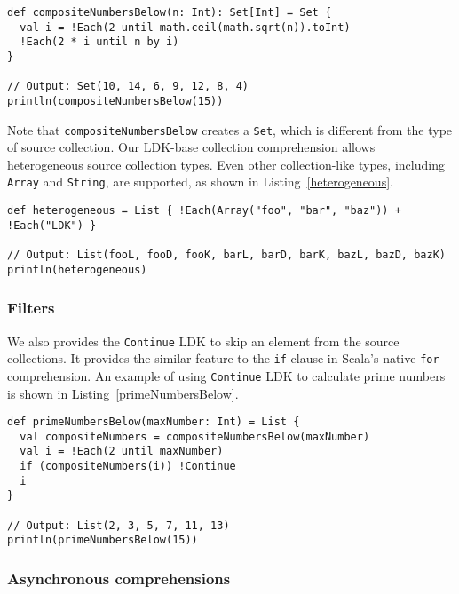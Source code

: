 \begin{lstlisting}[caption={Calculating all composite numbers below $n$ with \lstinline{Each} LDK, the simplicied version},label={compositeNumbersBelow-simplified}]
def compositeNumbersBelow(n: Int): Set[Int] = Set {
  val i = !Each(2 until math.ceil(math.sqrt(n)).toInt)
  !Each(2 * i until n by i)
}

// Output: Set(10, 14, 6, 9, 12, 8, 4)
println(compositeNumbersBelow(15))
\end{lstlisting}

Note that \lstinline{compositeNumbersBelow} creates a \lstinline{Set}, which is different from the type of source collection. Our LDK-base collection comprehension allows heterogeneous source collection types. Even other collection-like types, including \lstinline{Array} and \lstinline{String}, are supported, as shown in Listing~\ref{heterogeneous}.

\begin{lstlisting}[caption={LDK-based heterogeneous collection comprehension based on \lstinline{Array} and \lstinline{String}},label={heterogeneous}]
def heterogeneous = List { !Each(Array("foo", "bar", "baz")) + !Each("LDK") }

// Output: List(fooL, fooD, fooK, barL, barD, barK, bazL, bazD, bazK)
println(heterogeneous)
\end{lstlisting}
\subsubsection{Filters}

We also provides the \lstinline{Continue} LDK to skip an element from the source collections. It provides the similar feature to the \lstinline{if} clause in Scala's native \lstinline{for}-comprehension. An example of using \lstinline{Continue} LDK to calculate prime numbers is shown in Listing~\ref{primeNumbersBelow}.

\begin{lstlisting}[caption={Calculating all prime numbers below $n$ with \lstinline{Each} and \lstinline{Continue} LDK},label={primeNumbersBelow}]
def primeNumbersBelow(maxNumber: Int) = List {
  val compositeNumbers = compositeNumbersBelow(maxNumber)
  val i = !Each(2 until maxNumber)
  if (compositeNumbers(i)) !Continue
  i
}

// Output: List(2, 3, 5, 7, 11, 13)
println(primeNumbersBelow(15))
\end{lstlisting}

\subsubsection{Asynchronous comprehensions}\label{Asynchronous comprehensions}

